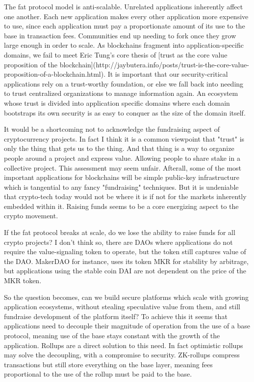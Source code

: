 The fat protocol model is anti-scalable. Unrelated applications inherently affect one another. Each new application makes every other application more expensive to use, since each application must pay a proportionate amount of its use to the base in transaction fees. Communities end up needing to fork once they grow large enough in order to scale. As blockchains fragment into application-specific domains, we fail to meet Eric Tung's core thesis of [trust as the core value proposition of the blockchain](http://jaybutera.info/posts/trust-is-the-core-value-proposition-of-a-blockchain.html). It is important that our security-critical applications rely on a trust-worthy foundation, or else we fall back into needing to trust centralized organizations to manage information again. An ecosystem whose trust is divided into application specific domains where each domain bootstraps its own security is as easy to conquer as the size of the domain itself.


It would be a shortcoming not to acknowledge the fundraising aspect of cryptocurrency projects. In fact I think it is a common viewpoint that "trust" is only the thing that gets us to the thing. And that thing is a way to organize people around a project and express value. Allowing people to share stake in a collective project. This assessment may seem unfair. Afterall, some of the most important applications for blockchains will be simple public-key infrastructure which is tangential to any fancy "fundraising" techniques. But it is undeniable that crypto-tech today would not be where it is if not for the markets inherently embedded within it. Raising funds seems to be a core energizing aspect to the crypto movement.

If the fat protocol breaks at scale, do we lose the ability to raise funds for all crypto projects? I don't think so, there are DAOs where applications do not require the value-signaling token to operate, but the token still captures value of the DAO. MakerDAO for instance, uses its token MKR for stability by arbitrage, but applications using the stable coin DAI are not dependent on the price of the MKR token.

So the question becomes, can we build secure platforms which scale with growing application ecosystems, without stealing speculative value from them, and still fundraise development of the platform itself? To achieve this it seems that applications need to decouple their magnitude of operation from the use of a base protocol, meaning use of the base stays constant with the growth of the application. Rollups are a direct solution to this need. In fact optimistic rollups may solve the decoupling, with a compromise to security. ZK-rollups compress transactions but still store everything on the base layer, meaning fees proportional to the use of the rollup must be paid to the base.


